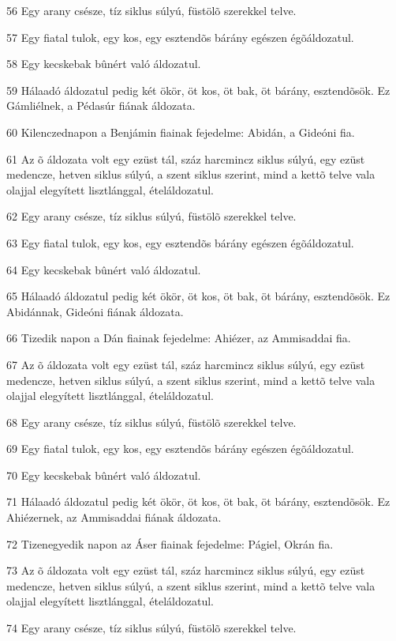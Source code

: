 \par 56 Egy arany csésze, tíz siklus súlyú, füstölõ szerekkel telve.
\par 57 Egy fiatal tulok, egy kos, egy esztendõs bárány egészen égõáldozatul.
\par 58 Egy kecskebak bûnért való áldozatul.
\par 59 Hálaadó áldozatul pedig két ökör, öt kos, öt bak, öt bárány, esztendõsök. Ez Gámliélnek, a Pédasúr fiának áldozata.
\par 60 Kilenczednapon a Benjámin fiainak fejedelme: Abidán, a Gideóni fia.
\par 61 Az õ áldozata volt egy ezüst tál, száz harcmincz siklus súlyú, egy ezüst medencze, hetven siklus súlyú, a szent siklus szerint, mind a kettõ telve vala olajjal elegyített lisztlánggal, ételáldozatul.
\par 62 Egy arany csésze, tíz siklus súlyú, füstölõ szerekkel telve.
\par 63 Egy fiatal tulok, egy kos, egy esztendõs bárány egészen égõáldozatul.
\par 64 Egy kecskebak bûnért való áldozatul.
\par 65 Hálaadó áldozatul pedig két ökör, öt kos, öt bak, öt bárány, esztendõsök. Ez Abidánnak, Gideóni fiának áldozata.
\par 66 Tizedik napon a Dán fiainak fejedelme: Ahiézer, az Ammisaddai fia.
\par 67 Az õ áldozata volt egy ezüst tál, száz harcmincz siklus súlyú, egy ezüst medencze, hetven siklus súlyú, a szent siklus szerint, mind a kettõ telve vala olajjal elegyített lisztlánggal, ételáldozatul.
\par 68 Egy arany csésze, tíz siklus súlyú, füstölõ szerekkel telve.
\par 69 Egy fiatal tulok, egy kos, egy esztendõs bárány egészen égõáldozatul.
\par 70 Egy kecskebak bûnért való áldozatul.
\par 71 Hálaadó áldozatul pedig két ökör, öt kos, öt bak, öt bárány, esztendõsök. Ez Ahiézernek, az Ammisaddai fiának áldozata.
\par 72 Tizenegyedik napon az Áser fiainak fejedelme: Págiel, Okrán fia.
\par 73 Az õ áldozata volt egy ezüst tál, száz harcmincz siklus súlyú, egy ezüst medencze, hetven siklus súlyú, a szent siklus szerint, mind a kettõ telve vala olajjal elegyített lisztlánggal, ételáldozatul.
\par 74 Egy arany csésze, tíz siklus súlyú, füstölõ szerekkel telve.
